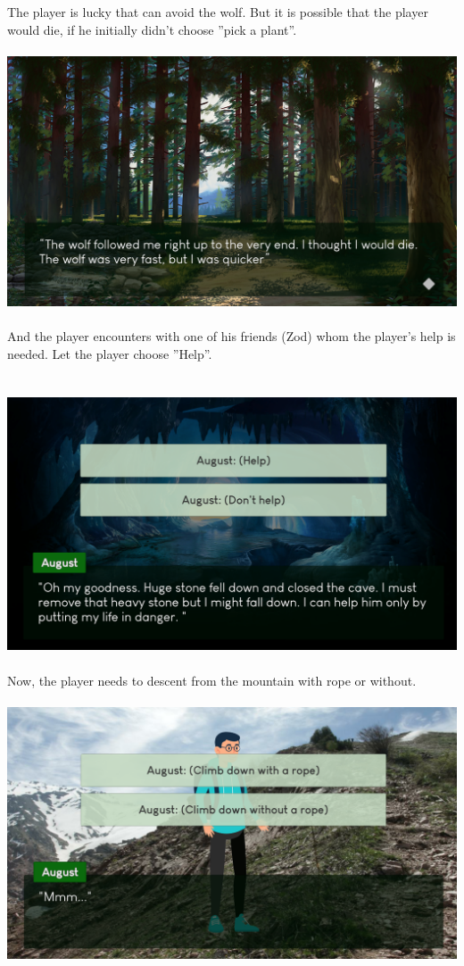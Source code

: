 \documentclass[12pt,a4paper]{article}
\newcommand{\ind}{\indent\indent}
\begin{document}
The player is lucky that can avoid the wolf. But it is possible that the player would die, if he initially didn't choose ''pick a plant''. 
\ind\\ \ind\\
\includegraphics[scale=0.35]{images/3}
\ind\\ \ind\\
And the player encounters with one of his friends (Zod) whom the player's help is needed. Let the player choose ''Help''.\\
\ind\\ \ind\\
\includegraphics[scale=0.35]{images/4}
\ind\\ \ind\\
Now, the player needs to descent from the mountain with rope or without. 
\ind\\ \ind\\
\includegraphics[scale=0.35]{images/5}
\end{document}
